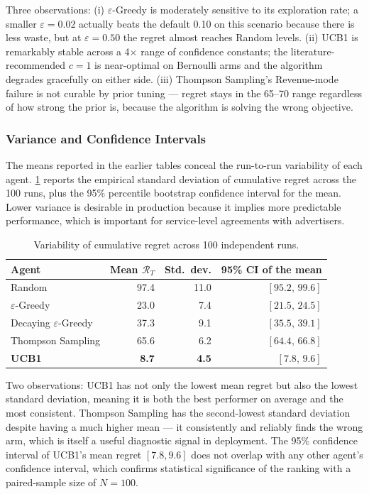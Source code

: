 Three observations: (i) $\varepsilon$-Greedy is moderately sensitive to its exploration rate; a smaller $\varepsilon = 0.02$ actually beats the default 0.10 on this scenario because there is less waste, but at $\varepsilon = 0.50$ the regret almost reaches Random levels. (ii) UCB1 is remarkably stable across a 4$\times$ range of confidence constants; the literature-recommended $c = 1$ is near-optimal on Bernoulli arms and the algorithm degrades gracefully on either side. (iii) Thompson Sampling's Revenue-mode failure is not curable by prior tuning --- regret stays in the 65--70 range regardless of how strong the prior is, because the algorithm is solving the wrong objective.

\subsubsection{Variance and Confidence Intervals}
The means reported in the earlier tables conceal the run-to-run variability of each agent. \cref{tab:variance} reports the empirical standard deviation of cumulative regret across the 100 runs, plus the 95\% percentile bootstrap confidence interval for the mean. Lower variance is desirable in production because it implies more predictable performance, which is important for service-level agreements with advertisers.

\begin{table}[H]
\centering
\caption{Variability of cumulative regret across 100 independent runs.}
\label{tab:variance}
\small
\renewcommand{\arraystretch}{1.2}
\begin{tabular}{lrrr}
\toprule
\textbf{Agent} & \textbf{Mean $\mathcal{R}_T$} & \textbf{Std.\ dev.} & \textbf{95\% CI of the mean}\\
\midrule
Random                          & 97.4  & 11.0 & $[95.2,\, 99.6]$\\
$\varepsilon$-Greedy            & 23.0  & 7.4  & $[21.5,\, 24.5]$\\
Decaying $\varepsilon$-Greedy   & 37.3  & 9.1  & $[35.5,\, 39.1]$\\
Thompson Sampling               & 65.6  & 6.2  & $[64.4,\, 66.8]$\\
\textbf{UCB1}                   & \textbf{8.7}   & \textbf{4.5}  & $[\mathbf{7.8},\, \mathbf{9.6}]$\\
\bottomrule
\end{tabular}
\end{table}

Two observations: UCB1 has not only the lowest mean regret but also the lowest standard deviation, meaning it is both the best performer on average and the most consistent. Thompson Sampling has the second-lowest standard deviation despite having a much higher mean --- it consistently and reliably finds the wrong arm, which is itself a useful diagnostic signal in deployment. The 95\% confidence interval of UCB1's mean regret $[7.8, 9.6]$ does not overlap with any other agent's confidence interval, which confirms statistical significance of the ranking with a paired-sample size of $N = 100$.

